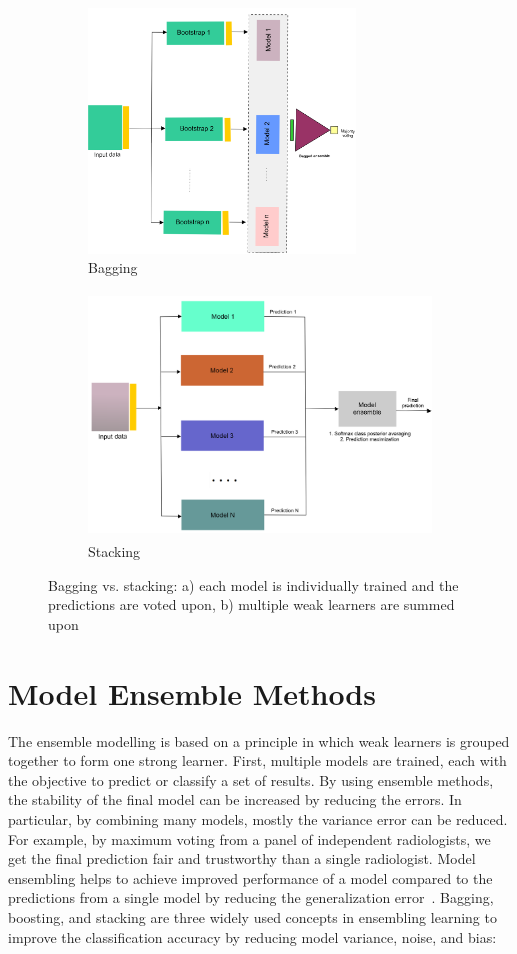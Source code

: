 \begin{figure}[htp!]
	\centering
	\begin{subfigure}{.48\linewidth}
		\centering
		\includegraphics[width=\linewidth,height=65mm]{images/bagging.png}
		\caption{Bagging}
        \label{fig:bagging}
	\end{subfigure}
	\hspace{2mm}
	\begin{subfigure}{0.48\linewidth}
		\centering
		\includegraphics[width=\linewidth,height=65mm]{images/stacking.png}
		\caption{Stacking}
        \label{fig:stacking}
	\end{subfigure}
	\caption{Bagging vs. stacking: a) each model is individually trained and the predictions are voted upon, b) multiple weak learners are summed upon} 
	\label{fig:bagging_and_stacking}
	\vspace{-2mm}
\end{figure}

\section{Model Ensemble Methods}
The ensemble modelling is based on a principle in which weak learners is grouped together to form one strong learner. First, multiple models are trained, each with the objective to predict or classify a set of results. By using ensemble methods, the stability of the final model can be increased by reducing the errors. In particular, by combining many models, mostly the variance error can be reduced. For example, by maximum voting from a panel of independent radiologists, we get the final prediction fair and trustworthy than a single radiologist. 
Model ensembling helps to achieve improved performance of a model compared to the predictions from a single model by reducing the generalization error~\cite{karimACCA2019}. Bagging, boosting, and stacking are three widely used concepts in ensembling learning to improve the classification accuracy by reducing model variance, noise, and bias: 

